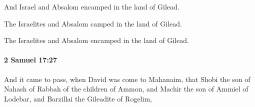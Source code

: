			\begin{versebox}
					\item[BHS] 
					\item[ASV] And Israel and Absalom encamped in the land of Gilead.
					\item[NIV] The Israelites and Absalom camped in the land of Gilead.
					\item[NRSV] The Israelites and Absalom encamped in the land of Gilead.
			\end{versebox}

		\paragraph{2 Samuel 17:27} %
			\label{2SAMUEL-17-27}

			And it came to pass, when David was come to Mahanaim, that Shobi the son of Nahash of Rabbah of the children of Ammon, and Machir the son of Ammiel of Lodebar, and Barzillai the Gileadite of Rogelim,

